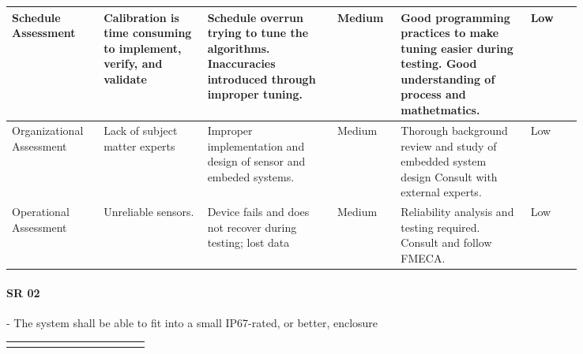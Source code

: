 \begin{landscape}
{\begin{longtable}{| p{0.12\linewidth} | p{0.16\linewidth} |  p{0.20\linewidth} | p{0.08\linewidth} | p{0.20\linewidth} | p{0.08\linewidth} |}
	\hline
	Schedule \newline Assessment & Calibration is time consuming to implement, verify, and validate & Schedule overrun trying to tune the algorithms. \newline Inaccuracies introduced through improper tuning. & \cellcolor{yellow} Medium & Good programming practices to make tuning easier during testing. \newline Good understanding of process and mathetmatics. & \cellcolor{green} Low \\
	\hline
	Organizational \newline Assessment & Lack of subject matter experts & Improper implementation and design of sensor and embeded systems. & \cellcolor{yellow} Medium & Thorough background review and study of embedded system design \newline Consult with external experts. & \cellcolor{green} Low \\
	\hline
	Operational \newline Assessment & Unreliable sensors. & Device fails and does not recover during testing; lost data & \cellcolor{yellow} Medium & Reliability analysis and testing required. \newline Consult and follow FMECA. & \cellcolor{green} Low
	\label{tab:sr01_feasibility}
\end{longtable}
}
\newpage




\paragraph*{SR 02} - The system shall be able to fit into a small IP67-rated, or better, enclosure

{\fontsize{8pt}{8pt}\selectfont
\begin{longtable}{| p{0.12\linewidth} | p{0.16\linewidth} |  p{0.20\linewidth} | p{0.08\linewidth} | p{0.20\linewidth} | p{0.08\linewidth} |}
	\hline \endlastfoot
	

\end{longtable}}
\end{landscape}
